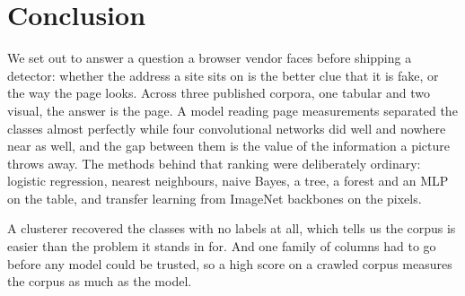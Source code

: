 \documentclass[11pt,journal,a4paper]{IEEEtran}
\begin{document}
\section{Conclusion}

We set out to answer a question a browser vendor faces before shipping a detector: whether the address a site
sits on is the better clue that it is fake, or the way the page looks. Across three published corpora, one
tabular and two visual, the answer is the page. A model reading page measurements separated the classes almost
perfectly while four convolutional networks did well and nowhere near as well, and the gap between them is the
value of the information a picture throws away. The methods behind that ranking were deliberately ordinary:
logistic regression, nearest neighbours, naive Bayes, a tree, a forest and an MLP on the table, and transfer
learning from ImageNet backbones on the pixels.

A clusterer recovered the classes with no labels at all, which tells us the corpus
is easier than the problem it stands in for. And one family of columns had to go before any model could be
trusted, so a high score on a crawled corpus measures the corpus as much as the model.
\end{document}
